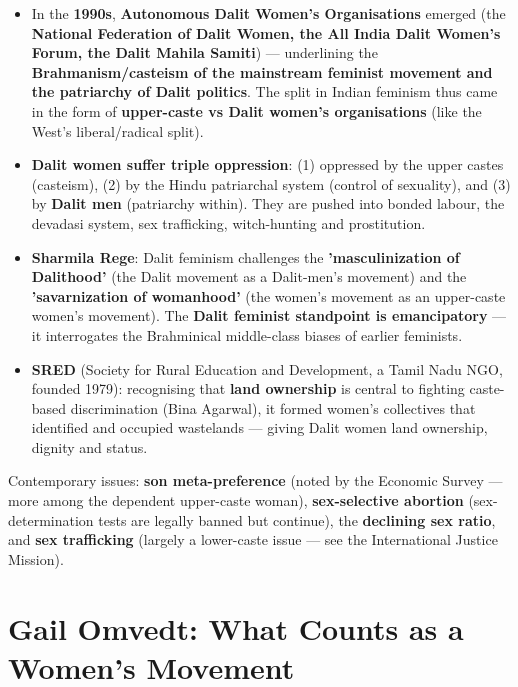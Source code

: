 \begin{KeyConcept}
\begin{itemize}
\item In the \textbf{1990s}, \textbf{Autonomous Dalit Women's Organisations} emerged (the \textbf{National Federation of Dalit Women, the All India Dalit Women's Forum, the Dalit Mahila Samiti}) --- underlining the \textbf{Brahmanism/casteism of the mainstream feminist movement and the patriarchy of Dalit politics}. The split in Indian feminism thus came in the form of \textbf{upper-caste vs Dalit women's organisations} (like the West's liberal/radical split).
\item \textbf{Dalit women suffer triple oppression}: (1) oppressed by the upper castes (casteism), (2) by the Hindu patriarchal system (control of sexuality), and (3) by \textbf{Dalit men} (patriarchy within). They are pushed into bonded labour, the devadasi system, sex trafficking, witch-hunting and prostitution.
\item \textbf{Sharmila Rege}: Dalit feminism challenges the \textbf{'masculinization of Dalithood'} (the Dalit movement as a Dalit-men's movement) and the \textbf{'savarnization of womanhood'} (the women's movement as an upper-caste women's movement). The \textbf{Dalit feminist standpoint is emancipatory} --- it interrogates the Brahminical middle-class biases of earlier feminists.
\item \textbf{SRED} (Society for Rural Education and Development, a Tamil Nadu NGO, founded 1979): recognising that \textbf{land ownership} is central to fighting caste-based discrimination (Bina Agarwal), it formed women's collectives that identified and occupied wastelands --- giving Dalit women land ownership, dignity and status.
\end{itemize}
\end{KeyConcept}

\begin{ExampleBox}
Contemporary issues: \textbf{son meta-preference} (noted by the Economic Survey --- more among the dependent upper-caste woman), \textbf{sex-selective abortion} (sex-determination tests are legally banned but continue), the \textbf{declining sex ratio}, and \textbf{sex trafficking} (largely a lower-caste issue --- see the International Justice Mission).
\end{ExampleBox}

\section{Gail Omvedt: What Counts as a Women's Movement}

